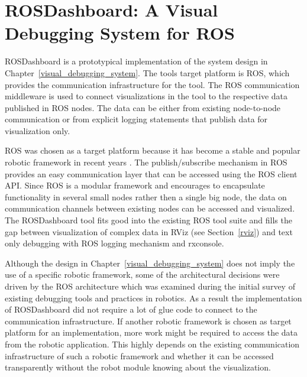 \chapter{ROSDashboard: A Visual Debugging System for ROS}
\label{rosdashboard}

ROSDashboard is a prototypical implementation of the system design in Chapter~\ref{visual_debugging_system}. The tools target platform is ROS, which provides the communication infrastructure for the tool. The ROS communication middleware is used to connect visualizations in the tool to the respective data published in ROS nodes. The data can be either from existing node-to-node communication or from explicit logging statements that publish data for visualization only.

ROS was chosen as a target platform because it has become a stable and popular robotic framework in recent years \cite{Foote2012}. The publish/subscribe mechanism in ROS provides an easy communication layer that can be accessed using the ROS client API. Since ROS is a modular framework and encourages to encapsulate functionality in several small nodes rather then a single big node, the data on communication channels between existing nodes can be accessed and visualized. The ROSDashboard tool fits good into the existing ROS tool suite and fills the gap between visualization of complex data in RViz (see Section~\ref{rviz}) and text only debugging with ROS logging mechanism and rxconsole.

Although the design in Chapter~\ref{visual_debugging_system} does not imply the use of a specific robotic framework, some of the architectural decisions were driven by the ROS architecture which was examined during the initial survey of existing debugging tools and practices in robotics. As a result the implementation of ROSDashboard did not require a lot of glue code to connect to the communication infrastructure. If another robotic framework is chosen as target platform for an implementation, more work might be required to access the data from the robotic application. This highly depends on the existing communication infrastructure of such a robotic framework and whether it can be accessed transparently without the robot module knowing about the visualization.



